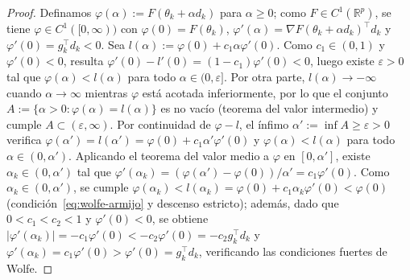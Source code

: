 \documentclass[a4paper,openany,oneside,10pt]{report}
\theoremstyle{pnlTeorema}
\theoremstyle{pnlDefinicion}
\theoremstyle{pnlObservacion}
\begin{document}
\begin{proof}
Definamos $\varphi(\alpha):=F(\theta_k+\alpha d_k)$ para $\alpha\ge 0$; como $F\in C^1(\mathbb{R}^p)$, se tiene $\varphi\in C^1([0,\infty))$ con $\varphi(0)=F(\theta_k)$, $\varphi'(\alpha)=\nabla F(\theta_k+\alpha d_k)^\top d_k$ y $\varphi'(0)=g_k^\top d_k<0$. Sea $l(\alpha):=\varphi(0)+c_1\alpha\varphi'(0)$. Como $c_1\in(0,1)$ y $\varphi'(0)<0$, resulta $\varphi'(0)-l'(0)=(1-c_1)\varphi'(0)<0$, luego existe $\varepsilon>0$ tal que $\varphi(\alpha)<l(\alpha)$ para todo $\alpha\in(0,\varepsilon]$. Por otra parte, $l(\alpha)\to-\infty$ cuando $\alpha\to\infty$ mientras $\varphi$ está acotada inferiormente, por lo que el conjunto $A:=\{\alpha>0:\varphi(\alpha)=l(\alpha)\}$ es no vacío (teorema del valor intermedio) y cumple $A\subset(\varepsilon,\infty)$. Por continuidad de $\varphi-l$, el ínfimo $\alpha':=\inf A\ge\varepsilon>0$ verifica $\varphi(\alpha')=l(\alpha')=\varphi(0)+c_1\alpha'\varphi'(0)$ y $\varphi(\alpha)<l(\alpha)$ para todo $\alpha\in(0,\alpha')$. Aplicando el teorema del valor medio a $\varphi$ en $[0,\alpha']$, existe $\alpha_k\in(0,\alpha')$ tal que $\varphi'(\alpha_k)=(\varphi(\alpha')-\varphi(0))/\alpha'=c_1\varphi'(0)$. Como $\alpha_k\in(0,\alpha')$, se cumple $\varphi(\alpha_k)<l(\alpha_k)=\varphi(0)+c_1\alpha_k\varphi'(0)<\varphi(0)$ (condición~\eqref{eq:wolfe-armijo} y descenso estricto); además, dado que $0<c_1<c_2<1$ y $\varphi'(0)<0$, se obtiene $|\varphi'(\alpha_k)|=-c_1\varphi'(0)<-c_2\varphi'(0)=-c_2 g_k^\top d_k$ y $\varphi'(\alpha_k)=c_1\varphi'(0)>\varphi'(0)=g_k^\top d_k$, verificando las condiciones fuertes de Wolfe.
\end{proof}
\end{document}
